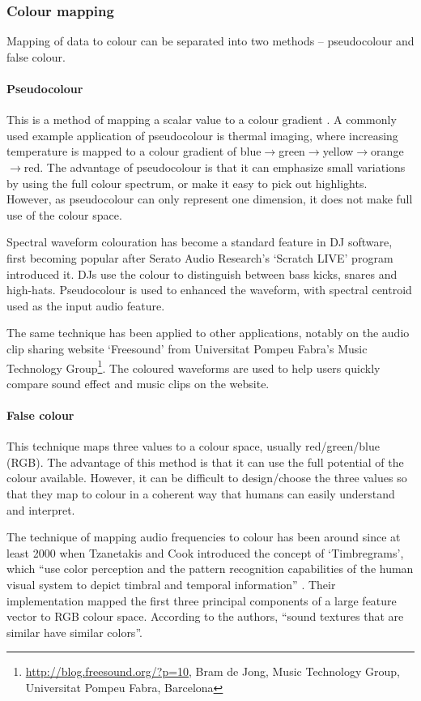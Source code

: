 \subsubsection{Colour mapping}\label{sec:background-colourmapping}
Mapping of data to colour can be separated into two methods -- pseudocolour and
false colour.

\paragraph{Pseudocolour}
This is a method of mapping a scalar value to a colour gradient
\citep{Moreland2009}. A commonly used example application of pseudocolour is
thermal imaging, where increasing temperature is mapped to a colour gradient of
blue$\to$green$\to$yellow$\to$orange$\to$red. The advantage of pseudocolour is
that it can emphasize small variations by using the full colour spectrum, or
make it easy to pick out highlights. However, as pseudocolour can only
represent one dimension, it does not make full use of the colour space.

Spectral waveform colouration has become a standard feature in DJ software,
first becoming popular after Serato Audio Research's `Scratch LIVE' program
introduced it.  DJs use the colour to distinguish between bass kicks, snares
and high-hats. Pseudocolour is used to enhanced the waveform, with spectral
centroid used as the input audio feature.

The same technique has been applied to other applications, notably on the audio
clip sharing website `Freesound' from Universitat Pompeu Fabra's Music
Technology Group\footnote{\url{http://blog.freesound.org/?p=10}, Bram de Jong,
  Music Technology Group, Universitat Pompeu Fabra, Barcelona}. The coloured
waveforms are used to help users quickly compare sound effect and music clips
on the website.

\paragraph{False colour}
This technique maps three values to a colour space, usually red/green/blue
(RGB). The advantage of this method is that it can use the full potential of
the colour available. However, it can be difficult to design/choose the three
values so that they map to colour in a coherent way that humans can easily
understand and interpret.

The technique of mapping audio frequencies to colour has been around since at
least 2000 when Tzanetakis and Cook introduced the concept of `Timbregrams',
which ``use color perception and the pattern recognition capabilities of the
human visual system to depict timbral and temporal information''
\citep{Tzanetakis2000}. Their implementation mapped the first three principal
components of a large feature vector to RGB colour space. According to the
authors, ``sound textures that are similar have similar colors''.

